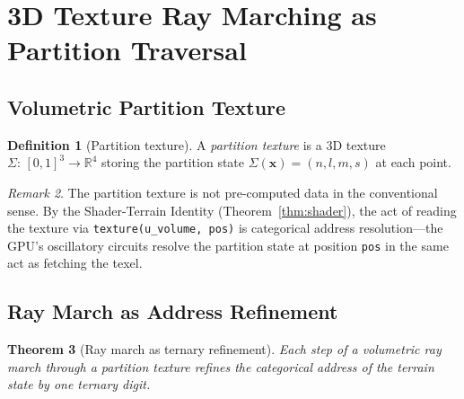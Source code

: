 \documentclass[10pt,twocolumn]{article}
\newtheorem{theorem}{Theorem}[section]
\theoremstyle{definition}
\newtheorem{definition}[theorem]{Definition}
\theoremstyle{remark}
\newtheorem{remark}[theorem]{Remark}
\newcommand{\R}{\mathbb{R}}
\begin{document}
\section{3D Texture Ray Marching as Partition Traversal}
\label{sec:raymarch}

\subsection{Volumetric Partition Texture}\label{sec:voltex}

\begin{definition}[Partition texture]\label{def:partex}
A \emph{partition texture} is a 3D texture
$\Sigma:\,[0,1]^3\to\R^4$ storing the partition state
$\Sigma(\mathbf{x})=(n,l,m,s)$ at each point.
\end{definition}

\begin{remark}
The partition texture is not pre-computed data in the
conventional sense.  By the Shader-Terrain Identity
(Theorem~\ref{thm:shader}), the act of reading the texture
via \texttt{texture(u\_volume, pos)} is categorical address
resolution---the GPU's oscillatory circuits resolve the
partition state at position \texttt{pos} in the same act as
fetching the texel.
\end{remark}

\subsection{Ray March as Address Refinement}
\label{sec:raymarch_steps}

\begin{theorem}[Ray march as ternary refinement]
\label{thm:raymarch}
Each step of a volumetric ray march through a partition texture
refines the categorical address of the terrain state by one
ternary digit.
\end{theorem}
\end{document}

